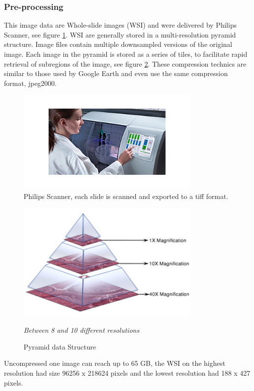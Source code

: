 \documentclass{article}
\begin{document}
\subsubsection*{Pre-processing}
This image data are Whole-slide images (WSI) and were delivered by Philips Scanner, see figure \ref{PhilipsScanner}. WSI are generally stored in a multi-resolution pyramid structure. Image files contain multiple downsampled versions of the original image. Each image in the pyramid is stored as a series of tiles, to facilitate rapid retrieval of subregions of the image, see figure \ref{Pyramid}. These compression technics are similar to those used by Google Earth and even use the same compression format, jpeg2000. 
\begin{figure}[!ht]
\centering
\includegraphics[width=0.8\textwidth]{PhilipsScanner.png}
\caption{Philips Scanner, each slide is scanned and exported to a tiff format.}
\label{PhilipsScanner}
\end{figure}
\begin{figure}[!ht]
\centering
\includegraphics[width=0.8\textwidth]{pyramid.png}
\caption{Pyramid data Structure}
\textit{Between 8 and 10 different resolutions}
\label{Pyramid}
\end{figure}
Uncompressed one image can reach up to 65 GB, the WSI on the highest resolution had size 96256 x 218624 pixels and the lowest resolution had 188 x 427 pixels.
\end{document}
